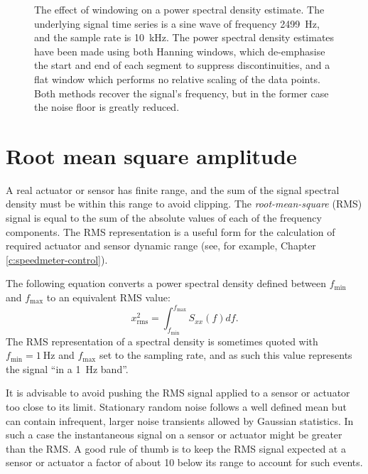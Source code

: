 \begin{figure}
  \centering
  
  \caption[The effect of windowing on a power spectral density estimate]{\label{fig:fft-windowing}The effect of windowing on a power spectral density estimate. The underlying signal time series is a sine wave of frequency \SI{2499}{\hertz}, and the sample rate is \SI{10}{\kilo\hertz}. The power spectral density estimates have been made using both Hanning windows, which de-emphasise the start and end of each segment to suppress discontinuities, and a flat window which performs no relative scaling of the data points. Both methods recover the signal's frequency, but in the former case the noise floor is greatly reduced.}
\end{figure}

\section{\label{sec:rms-amplitude}Root mean square amplitude}
A real actuator or sensor has finite range, and the sum of the signal spectral density must be within this range to avoid clipping. The \emph{root-mean-square} (\gls{RMS}) signal is equal to the sum of the absolute values of each of the frequency components. The \gls{RMS} representation is a useful form for the calculation of required actuator and sensor dynamic range (see, for example, Chapter\,\ref{c:speedmeter-control}).

The following equation converts a power spectral density defined between $f_{\text{min}}$ and $f_{\text{max}}$ to an equivalent \gls{RMS} value:
\begin{equation}
  \label{eq:spectral-density-to-rms}
  x_{\text{rms}}^2 = \int^{f_{\text{max}}}_{f_{\text{min}}} S_{xx} \left( f \right) df.
\end{equation}
The \gls{RMS} representation of a spectral density is sometimes quoted with $f_{\text{min}} = \SI{1}{\hertz}$ and $f_{\text{max}}$ set to the sampling rate, and as such this value represents the signal ``in a \SI{1}{\hertz} band''.

It is advisable to avoid pushing the \gls{RMS} signal applied to a sensor or actuator too close to its limit. Stationary random noise follows a well defined mean but can contain infrequent, larger noise transients allowed by Gaussian statistics. In such a case the instantaneous signal on a sensor or actuator might be greater than the \gls{RMS}. A good rule of thumb is to keep the \gls{RMS} signal expected at a sensor or actuator a factor of about \num{10} below its range to account for such events.

